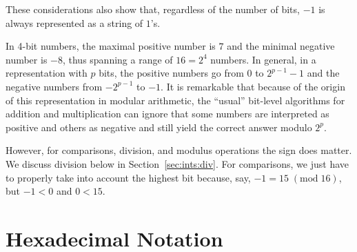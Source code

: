 \begin{note}
These considerations also show that, regardless of the number of
bits, $-1$ is always represented as a string of $1$'s.
\end{note}

In 4-bit numbers, the maximal positive number is $7$ and the
minimal negative number is $-8$, thus spanning a range of
$16 = 2^4$ numbers.  In general, in a representation with
$p$ bits, the positive numbers go from $0$ to $2^{p-1}-1$ and
the negative numbers from $-2^{p-1}$ to $-1$.  It is remarkable
that because of the origin of this representation in modular
arithmetic, the ``usual'' bit-level algorithms for addition
and multiplication can ignore that some numbers are interpreted
as positive and others as negative and still yield the correct
answer modulo $2^p$.

However, for comparisons, division, and modulus operations the sign
does matter.  We discuss division below in Section~\ref{sec:ints:div}.  For
comparisons, we just have to properly take into account the highest
bit because, say, $-1 = 15\; (\mathrm{mod}\; 16)$, but $-1 < 0$ and $0
< 15$.


\section{Hexadecimal Notation}
\label{sec:ints:hex}


